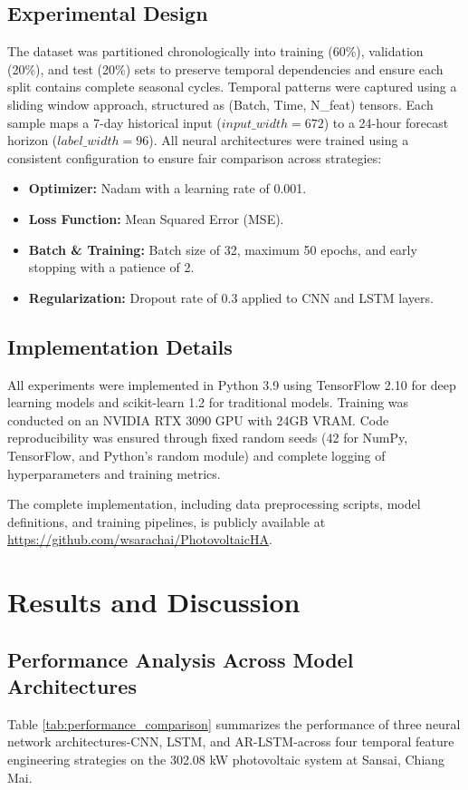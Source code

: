 \documentclass[conference]{IEEEtran}
\begin{document}
	\subsection{Experimental Design}
	The dataset was partitioned chronologically into training (60\%), validation (20\%), and test (20\%) sets to preserve temporal dependencies and ensure each split contains complete seasonal cycles. Temporal patterns were captured using a sliding window approach, structured as (Batch, Time, N\_{feat}) tensors. Each sample maps a 7-day historical input ($input\_width=672$) to a 24-hour forecast horizon ($label\_width=96$). All neural architectures were trained using a consistent configuration to ensure fair comparison across strategies:
	\begin{itemize}
		\item \textbf{Optimizer:} Nadam with a learning rate of 0.001.
		\item \textbf{Loss Function:} Mean Squared Error (MSE).
		\item \textbf{Batch \& Training:} Batch size of 32, maximum 50 epochs, and early stopping with a patience of 2.\item \textbf{Regularization:} Dropout rate of 0.3 applied to CNN and LSTM layers.
	\end{itemize}
	
	\subsection{Implementation Details}
	All experiments were implemented in Python 3.9 using TensorFlow 2.10 for deep learning models and scikit-learn 1.2 for traditional models. Training was conducted on an NVIDIA RTX 3090 GPU with 24GB VRAM. Code reproducibility was ensured through fixed random seeds (42 for NumPy, TensorFlow, and Python's random module) and complete logging of hyperparameters and training metrics.
	
	The complete implementation, including data preprocessing scripts, model definitions, and training pipelines, is publicly available at \url{https://github.com/wsarachai/PhotovoltaicHA}.
	
	
	\section{Results and Discussion}
	
	\subsection{Performance Analysis Across Model Architectures}
	Table \ref{tab:performance_comparison} summarizes the performance of three neural network architectures-CNN, LSTM, and AR-LSTM-across four temporal feature engineering strategies on the 302.08 kW photovoltaic system at Sansai, Chiang Mai.
	
\end{document}
